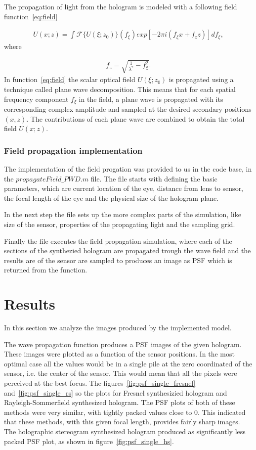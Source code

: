 \documentclass[12pt,a4paper,english
]{tunithesis}
\begin{document}
The propagation of light from the hologram is modeled with a following field function~\ref{eq:field}

\begin{align}
  \label{eq:field}
  U(x;z) = \int \mathscr{F} \{U (\xi;z_0) \} (f_\xi) exp[-2 \pi i (f_\xi x + f_z z)] d f_\xi,
\end{align}
where

\begin{align}
  \label{eq:focus}
  f_z = \sqrt{\frac{1}{\lambda^2} - f_\xi ^ 2}.
\end{align}
In function~\ref{eq:field} the scalar optical field $U(\xi;z_0)$ is propagated using a technique called plane wave decomposition. This means that for each spatial frequency component $f_\xi$ in the field, a plane wave is propagated with its corresponding complex amplitude and sampled at the desired secondary positions $(x, z)$. The contributions of each plane wave are combined to obtain the total field $U(x;z)$.~~\cite{labassignment}\cite{goodman2005introduction}

\subsection{Field propagation implementation}
The implementation of the field progation was provided to us in the code base, in the $propagateField\_PWD.m$ file. The file starts with defining the basic parameters, which are current location of the eye, distance from lens to sensor, the focal length of the eye and the physical size of the hologram plane.

In the next step the file sets up the more complex parts of the simulation, like size of the sensor, properties of the propagating light and the sampling grid.

Finally the file executes the field propagation simulation, where each of the sections of the synthezied hologram are propagated trough the wave field and the results are of the sensor are sampled to produces an image as PSF which is returned from the function.


\chapter{Results}
\label{sec:results}
In this section we analyze the images produced by the implemented model.

The wave propagation function produces a PSF images of the given hologram. These images were plotted as a function of the sensor positions. In the most optimal case all the values would be in a single pile at the zero coordinated of the sensor, i.e. the center of the sensor. This would mean that all the pixels were perceived at the best focus. The figures~\ref{fig:psf_single_fresnel} and~\ref{fig:psf_single_rs} so the plots for Fresnel synthesizied hologram and Rayleigh-Sommerfield synthesized hologram. The PSF plots of both of these methods were very similar, with tightly packed values close to 0. This indicated that these methods, with this given focal length, provides fairly sharp images. The holographic stereogram synthesized hologram produced as significantly less packed PSF plot, as shown in figure~\ref{fig:psf_single_hs}.
\end{document}
